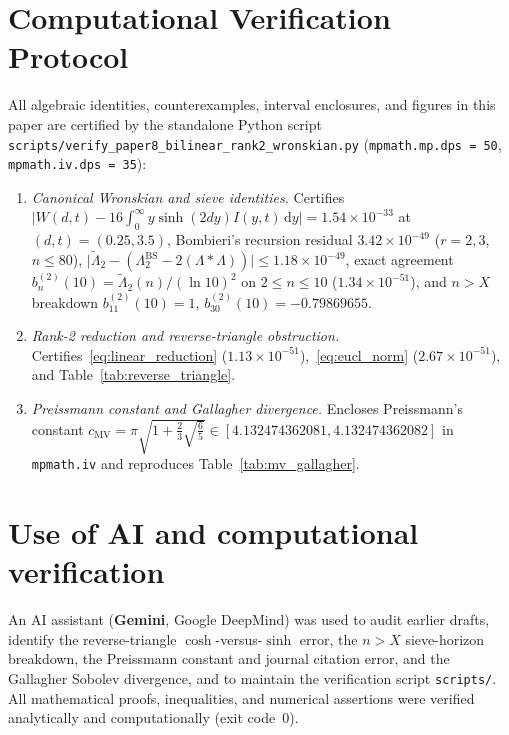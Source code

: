 \documentclass[11pt,reqno]{amsart}
\theoremstyle{definition}
\theoremstyle{remark}
\numberwithin{equation}{section}
\newcommand{\dd}{\,\mathrm{d}}
\begin{document}
\appendix

\section{Computational Verification Protocol}\label{app:verification}

{\sloppy
All algebraic identities, counterexamples, interval enclosures, and figures in this paper are certified by the standalone Python script \texttt{scripts/}\allowbreak\texttt{verify\_paper8\_}\allowbreak\texttt{bilinear\_rank2\_}\allowbreak\texttt{wronskian.py} (\texttt{mpmath.mp.dps = 50}, \texttt{mpmath.iv.dps = 35}):
\begin{enumerate}[label=\textup{(\arabic*)},leftmargin=2.2em]
\item \textit{Canonical Wronskian and sieve identities.} Certifies $\lvert W(d,t) - 16\int_0^{\infty} y\sinh(2dy)I(y,t)\dd y\rvert = 1.54 \times 10^{-33}$ at $(d,t) = (0.25, 3.5)$, Bombieri's recursion residual $3.42 \times 10^{-49}$ ($r = 2, 3$, $n \le 80$), $\lvert\widetilde{\Lambda}_2 - (\Lambda_2^{\mathrm{BS}} - 2(\Lambda * \Lambda))\rvert \le 1.18 \times 10^{-49}$, exact agreement $b_n^{(2)}(10) = \widetilde{\Lambda}_2(n)/(\ln 10)^2$ on $2 \le n \le 10$ ($1.34 \times 10^{-51}$), and $n > X$ breakdown $b_{11}^{(2)}(10) = 1$, $b_{30}^{(2)}(10) = -0.79869655$.
\item \textit{Rank-2 reduction and reverse-triangle obstruction.} Certifies~\eqref{eq:linear_reduction} ($1.13 \times 10^{-51}$),~\eqref{eq:eucl_norm} ($2.67 \times 10^{-51}$), and Table~\ref{tab:reverse_triangle}.
\item \textit{Preissmann constant and Gallagher divergence.} Encloses Preissmann's constant $c_{\mathrm{MV}} = \pi\sqrt{1 + \frac{2}{3}\sqrt{\frac{6}{5}}} \in [4.132474362081,\allowbreak 4.132474362082]$ in \texttt{mpmath.iv} and reproduces Table~\ref{tab:mv_gallagher}.
\end{enumerate}
\par}

\section*{Use of AI and computational verification}

{\sloppy
An AI assistant (\textbf{Gemini}, Google DeepMind) was used to audit earlier drafts, identify the reverse-triangle $\cosh$-versus-$\sinh$ error, the $n > X$ sieve-horizon breakdown, the Preissmann constant and journal citation error, and the Gallagher Sobolev divergence, and to maintain the verification script \texttt{scripts/}\allowbreak\texttt{}. All mathematical proofs, inequalities, and numerical assertions were verified analytically and computationally (exit code~$0$).\par}
\end{document}
